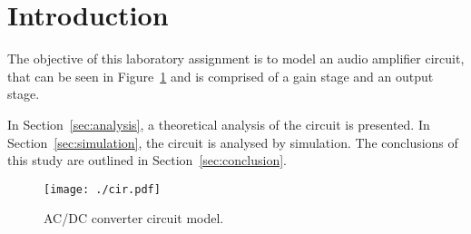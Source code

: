 \section{Introduction}
\label{sec:introduction}
The objective of this laboratory assignment is to model an audio amplifier circuit, that can be seen in Figure~\ref{fig:cir} and is comprised of a gain stage and an output stage.

In Section~\ref{sec:analysis}, a theoretical analysis of the circuit is presented. In Section~\ref{sec:simulation}, the circuit is analysed by simulation. The conclusions of this study are outlined in
Section~\ref{sec:conclusion}.

\begin{figure}[h] \centering
\texttt{[image: ./cir.pdf]}
\caption{AC/DC converter circuit model.}
\label{fig:cir}
\end{figure}

